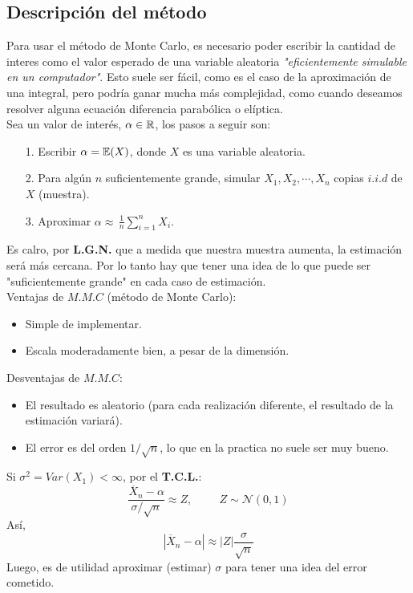 \subsection{Descripción del método}
Para usar el método de Monte Carlo, es necesario poder escribir la cantidad de interes como el valor esperado de una variable aleatoria \textit{"eficientemente simulable en un computador"}. Esto suele ser fácil, como es el caso de la aproximación de una integral, pero podría ganar mucha más complejidad, como cuando deseamos resolver alguna ecuación diferencia parabólica o elíptica.\\ \newline
Sea un valor de interés, $\alpha\in\mathbb R$, los pasos a seguir son:
\begin{itemize}
    \item[1.] Escribir $\alpha = \mathbb E(X)$, donde $X$ es una variable aleatoria.
    \item[2.] Para algún $n$ suficientemente grande, simular $X_1,X_2,\cdots,X_n$ copias $i.i.d$ de $X$ (muestra).
    \item[3.] Aproximar $\alpha\approx\,\frac{1}{n}\sum_{i=1}^nX_i$.
\end{itemize}
Es calro, por \textbf{L.G.N.} que a medida que nuestra muestra aumenta, la estimación será más cercana. Por lo tanto hay que tener una idea de lo que puede ser "suficientemente grande" en cada caso de estimación.\\
Ventajas de $M.M.C$ (método de Monte Carlo):\\
\begin{itemize}
    \item Simple de implementar.
    \item Escala moderadamente bien, a pesar de la dimensión.
\end{itemize}
Desventajas de $M.M.C$:
\begin{itemize}
    \item El resultado es aleatorio (para cada realización diferente, el resultado de la estimación variará).
    \item El error es del orden $1/\sqrt{n}$, lo que en la practica no suele ser muy bueno.
\end{itemize}
\begin{obs} Si $\sigma^2 = Var(X_1)<\infty$, por el \textbf{T.C.L.}:
\[\frac{\overline{X}_n -\alpha}{\sigma / \sqrt{n}}\approx Z,\hspace{1cm}Z\sim\mathcal{N}(0,1)\]
Así,
\[|\overline{X}_n -\alpha| \approx|Z|\frac{\sigma}{\sqrt{n}}\]
Luego, es de utilidad aproximar (estimar) $\sigma$ para tener una idea del error cometido. 
\end{obs}

